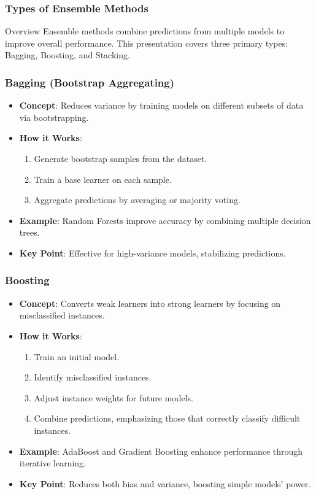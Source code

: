 \documentclass[aspectratio=169]{beamer}
\begin{document}
\begin{frame}[fragile]
    \frametitle{Types of Ensemble Methods}
    \begin{block}{Overview}
        Ensemble methods combine predictions from multiple models to improve overall performance. 
        This presentation covers three primary types: Bagging, Boosting, and Stacking.
    \end{block}
\end{frame}

\begin{frame}[fragile]
    \frametitle{Bagging (Bootstrap Aggregating)}
    \begin{itemize}
        \item \textbf{Concept}: Reduces variance by training models on different subsets of data via bootstrapping.
        \item \textbf{How it Works}:
            \begin{enumerate}
                \item Generate bootstrap samples from the dataset.
                \item Train a base learner on each sample.
                \item Aggregate predictions by averaging or majority voting.
            \end{enumerate}
        \item \textbf{Example}: Random Forests improve accuracy by combining multiple decision trees.
        \item \textbf{Key Point}: Effective for high-variance models, stabilizing predictions.
    \end{itemize}
\end{frame}

\begin{frame}[fragile]
    \frametitle{Boosting}
    \begin{itemize}
        \item \textbf{Concept}: Converts weak learners into strong learners by focusing on misclassified instances.
        \item \textbf{How it Works}:
            \begin{enumerate}
                \item Train an initial model.
                \item Identify misclassified instances.
                \item Adjust instance weights for future models.
                \item Combine predictions, emphasizing those that correctly classify difficult instances.
            \end{enumerate}
        \item \textbf{Example}: AdaBoost and Gradient Boosting enhance performance through iterative learning.
        \item \textbf{Key Point}: Reduces both bias and variance, boosting simple models' power.
    \end{itemize}
\end{frame}
\end{document}
